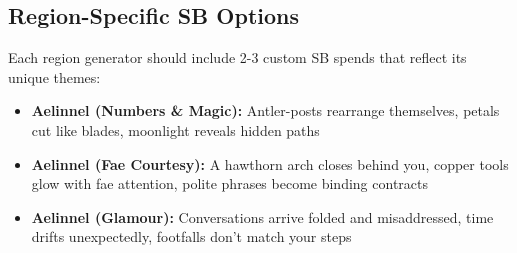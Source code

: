 \subsection*{Region-Specific SB Options}
Each region generator should include 2-3 custom SB spends that reflect its unique themes:

\begin{itemize}
\item \textbf{Aelinnel (Numbers \& Magic):} Antler-posts rearrange themselves, petals cut like blades, moonlight reveals hidden paths
\item \textbf{Aelinnel (Fae Courtesy):} A hawthorn arch closes behind you, copper tools glow with fae attention, polite phrases become binding contracts
\item \textbf{Aelinnel (Glamour):} Conversations arrive folded and misaddressed, time drifts unexpectedly, footfalls don't match your steps
\end{itemize}
